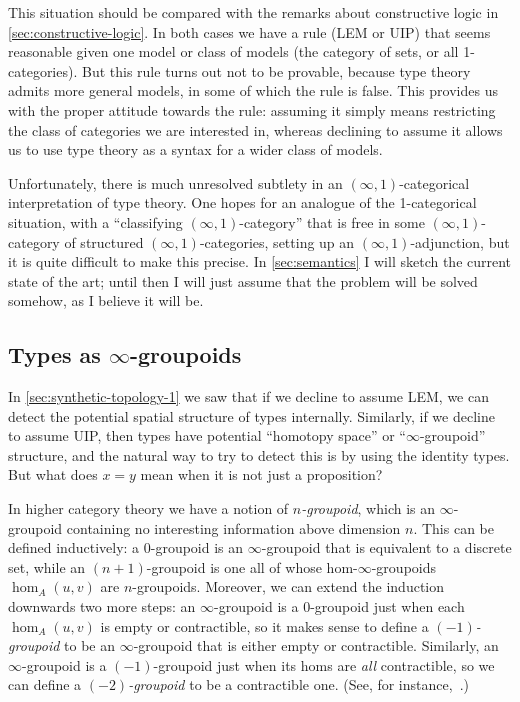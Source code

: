 \documentclass[12pt]{article}
\def\oo{\ensuremath{\infty}}
\def\io{\ensuremath{(\oo,1)}}
\def\N{\mathbb{N}}
\def\R{\mathbb{R}}
\numberwithin{equation}{section}
\begin{document}
This situation should be compared with the remarks about constructive logic in \cref{sec:constructive-logic}.
In both cases we have a rule (LEM or UIP) that seems reasonable given one model or class of models (the category of sets, or all 1-categories).
But this rule turns out not to be provable, because type theory admits more general models, in some of which the rule is false.
This provides us with the proper attitude towards the rule: assuming it simply means restricting the class of categories we are interested in, whereas declining to assume it allows us to use type theory as a syntax for a wider class of models.

Unfortunately, there is much unresolved subtlety in an $\io$-categorical interpretation of type theory.
One hopes for an analogue of the 1-categorical situation, with a ``classifying $\io$-category'' that is free in some \io-category of structured \io-categories, setting up an \io-adjunction, but it is quite difficult to make this precise.
In \cref{sec:semantics} I will sketch the current state of the art; until then I will just assume that the problem will be solved somehow, as I believe it will be.


\subsection{Types as \oo-groupoids}
\label{sec:oo-group-struct}

In \cref{sec:synthetic-topology-1} we saw that if we decline to assume LEM, we can detect the potential spatial structure of types internally. %
Similarly, if we decline to assume UIP, then types have potential ``homotopy space'' or ``\oo-groupoid'' structure, and the natural way to try to detect this is by using the identity types.
But what does $x=y$ mean when it is not just a proposition?

In higher category theory we have a notion of \emph{$n$-groupoid}, which is an \oo-groupoid containing no interesting information above dimension $n$.
This can be defined inductively: a $0$-groupoid is an \oo-groupoid that is equivalent to a discrete set, while an $(n+1)$-groupoid is one all of whose hom-\oo-groupoids $\hom_A(u,v)$ are $n$-groupoids.
Moreover, we can extend the induction downwards two more steps: an \oo-groupoid is a $0$-groupoid just when each $\hom_A(u,v)$ is empty or contractible, so it makes sense to define a \emph{$(-1)$-groupoid} to be an \oo-groupoid that is either empty or contractible.
Similarly, an \oo-groupoid is a $(-1)$-groupoid just when its homs are \emph{all} contractible, so we can define a \emph{$(-2)$-groupoid} to be a contractible one.
(See, for instance,~\cite[\S2]{bs:ncats-cohom}.)
\end{document}
